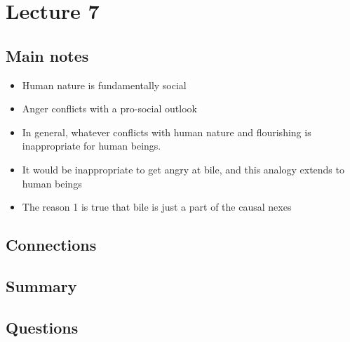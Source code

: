 \section{Lecture 7}

\subsection{Main notes}


\begin{itemize}
	\item Human nature is fundamentally social
  \item Anger conflicts with a pro-social outlook
  \item In general, whatever conflicts with human nature and flourishing is inappropriate for human beings.
\end{itemize}

\begin{itemize}
  \item It would be inappropriate to get angry at bile, and this analogy extends to human beings
  \item The reason 1 is true that bile is just a part of the causal nexes
\end{itemize}
\subsection{Connections}


\subsection{Summary}


\subsection{Questions}
